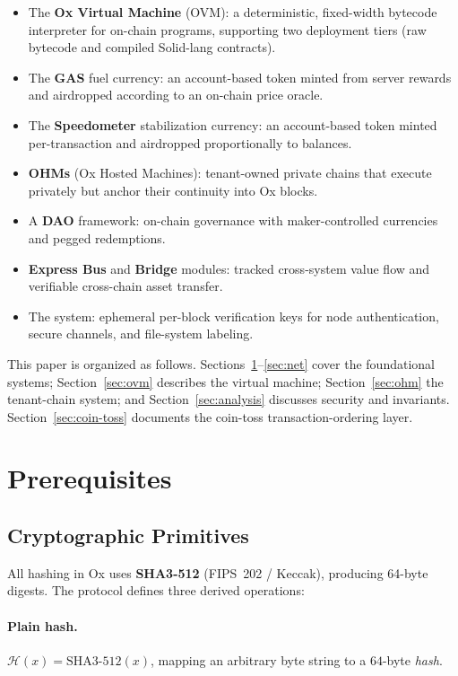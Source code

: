 \documentclass[11pt,a4paper]{article}
\theoremstyle{definition}
\newcommand{\ox}{\textsf{Ox}}
\newcommand{\ovm}{\textsf{OVM}}
\newcommand{\hash}{\mathcal{H}}
\begin{document}
\begin{itemize}[leftmargin=1.5em]
  \item The \textbf{Ox Virtual Machine} (\ovm{}): a deterministic, fixed-width
    bytecode interpreter for on-chain programs, supporting two deployment
    tiers (raw bytecode and compiled Solid-lang contracts).
  \item The \textbf{GAS} fuel currency: an account-based token minted from server
    rewards and airdropped according to an on-chain price oracle.
  \item The \textbf{Speedometer} stabilization currency: an account-based
    token minted per-transaction and airdropped proportionally to balances.
  \item \textbf{OHMs} (Ox Hosted Machines): tenant-owned private chains that
    execute privately but anchor their continuity into \ox{} blocks.
  \item A \textbf{DAO} framework: on-chain governance with maker-controlled
    currencies and pegged redemptions.
  \item \textbf{Express Bus} and \textbf{Bridge} modules: tracked
    cross-system value flow and verifiable cross-chain asset transfer.
  \item The \evk{} system: ephemeral per-block verification keys for node
    authentication, secure channels, and file-system labeling.
\end{itemize}

This paper is organized as follows.  Sections~\ref{sec:prelim}--\ref{sec:net}
cover the foundational systems; Section~\ref{sec:ovm} describes the virtual
machine; Section~\ref{sec:ohm} the tenant-chain system; and Section~\ref{sec:analysis}
discusses security and invariants.  Section~\ref{sec:coin-toss} documents
the coin-toss transaction-ordering layer.

\section{Prerequisites}
\label{sec:prelim}

\subsection{Cryptographic Primitives}
\label{sec:crypto}

All hashing in \ox{} uses \textbf{SHA3-512} (FIPS~202 / Keccak), producing
64-byte digests.  The protocol defines three derived operations:

\paragraph{Plain hash.} $\hash(x) = \mathrm{SHA3\text{-}512}(x)$, mapping an
arbitrary byte string to a $64$-byte \emph{hash}.
\end{document}
